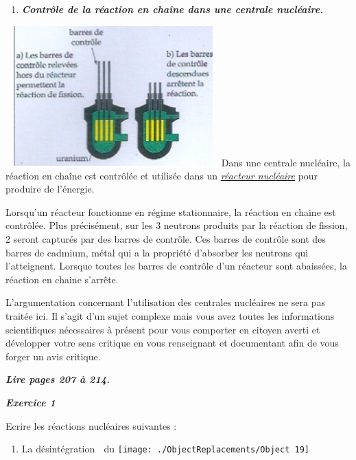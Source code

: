\begin{enumerate}
\def\labelenumi{\alph{enumi})}
\tightlist
\item
  \emph{\textbf{Contrôle de la réaction en chaîne dans une centrale
  nucléaire.}}
\end{enumerate}

\includegraphics[width=8.327cm,height=5.385cm]{Pictures/10000001000000DA0000009916BD0968417286CD.png}Dans
une centrale nucléaire, la réaction en chaîne est contrôlée et utilisée
dans un
\href{https://fr.wikipedia.org/wiki/R\%C3\%A9acteur_nucl\%C3\%A9aire}{\emph{\emph{réacteur
nucléaire}}} pour produire de l'énergie.

Lorsqu'un réacteur fonctionne en régime stationnaire, la réaction en
chaine est contrôlée. Plus précisément, sur les 3 neutrons produits par
la réaction de fission, 2 seront capturés par des barres de contrôle.
Ces barres de contrôle sont des barres de cadmium, métal qui a la
propriété d'absorber les neutrons qui l'atteignent. Lorsque toutes les
barres de contrôle d'un réacteur sont abaissées, la réaction en chaine
s'arrête.

L'argumentation concernant l'utilisation des centrales nucléaires ne
sera pas traitée ici. Il s'agit d'un sujet complexe mais vous avez
toutes les informations scientifiques nécessaires à présent pour vous
comporter en citoyen averti et développer votre sens critique en vous
renseignant et documentant afin de vous forger un avis critique.

\emph{\textbf{Lire pages 207 à 214. }}

\emph{\textbf{Exercice 1}}

Ecrire les réactions nucléaires suivantes :

\begin{enumerate}
\def\labelenumi{\alph{enumi})}
\tightlist
\item
  La désintégration  du
  \texttt{[image: ./ObjectReplacements/Object 19]}
\end{enumerate}

